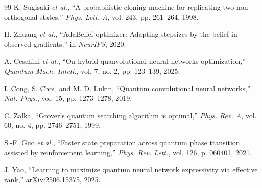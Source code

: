 \documentclass[onecolumn,12pt]{IEEEtran}
\begin{document}
\begin{thebibliography}{99}
K. Sugisaki \textit{et al.},
“A probabilistic cloning machine for replicating two non-orthogonal states,”
\textit{Phys. Lett. A}, vol. 243, pp. 261–264, 1998.

H. Zhuang \textit{et al.},
“AdaBelief optimizer: Adapting stepsizes by the belief in observed gradients,”
in \textit{NeurIPS}, 2020.

A. Ceschini \textit{et al.},
“On hybrid quanvolutional neural networks optimization,”
\textit{Quantum Mach. Intell.}, vol. 7, no. 2, pp. 123–139, 2025.

I. Cong, S. Choi, and M. D. Lukin,
“Quantum convolutional neural networks,”
\textit{Nat. Phys.}, vol. 15, pp. 1273–1278, 2019.

C. Zalka,
“Grover’s quantum searching algorithm is optimal,”
\textit{Phys. Rev. A}, vol. 60, no. 4, pp. 2746–2751, 1999.

S.-F. Guo \textit{et al.},
“Faster state preparation across quantum phase transition assisted by reinforcement learning,”
\textit{Phys. Rev. Lett.}, vol. 126, p. 060401, 2021.

J. Yao,
“Learning to maximize quantum neural network expressivity via effective rank,”
arXiv:2506.15375, 2025.

\end{thebibliography}
\end{document}
